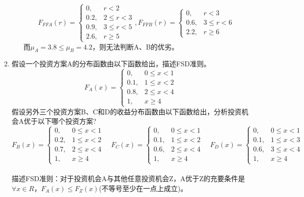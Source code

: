 \begin{enumerate}
\begin{enumerate}[label=(\arabic*)]
        \[F_{FFA}(r)=\begin{cases}
            0, & r < 2\\
            0.2, & 2 \leqslant r < 3\\
            0.9, & 3 \leqslant r < 5\\
            2.6, & r \geqslant 5
        \end{cases},F_{FFB}(r)=\begin{cases}
            0, & r < 3\\
            0.6, & 3 \leqslant r < 6\\
            2.2, & r \geqslant 6
        \end{cases}\]
        而$\mu_A=3.8 \leqslant \mu_B=4.2$，则无法判断A、B的优劣。
    \end{enumerate}
    \item 假设一个投资方案A的分布函数由以下函数给出，描述FSD准则。
    \[F_A(x)=\begin{cases}
        0, & 0 \leqslant x < 1\\
        0.1, & 1 \leqslant x < 2\\
        0.8, & 2 \leqslant x < 4\\
        1, & x \geqslant 4
    \end{cases}\]
    假设另外三个投资方案B、C和D的收益分布函数由以下函数给出，分析投资机会A优于以下哪个投资方案?
    \[F_B(x)=\begin{cases}
        0, & 0 \leqslant x < 1\\
        0.2, & 1 \leqslant x < 2\\
        0.7, & 2 \leqslant x < 4\\
        1, & x \geqslant 4
    \end{cases} \quad F_C(x)=\begin{cases}
        0, & 0 \leqslant x < 1\\
        0.1, & 1 \leqslant x < 2\\
        0.6, & 2 \leqslant x < 4\\
        1, & x \geqslant 4
    \end{cases} \quad F_D(x)=\begin{cases}
        0, & 0 \leqslant x < 1\\
        0.1, & 1 \leqslant x < 3\\
        0.6, & 3 \leqslant x < 4\\
        1, & x \geqslant 4
    \end{cases}\]
    \sol\\
    描述FSD准则：对于投资机会A与其他任意投资机会Z，A优于Z的充要条件是$\forall x \in R$，$F_A(x) \leqslant F_Z(x)$(不等号至少在一点上成立)。\\

\end{enumerate}
